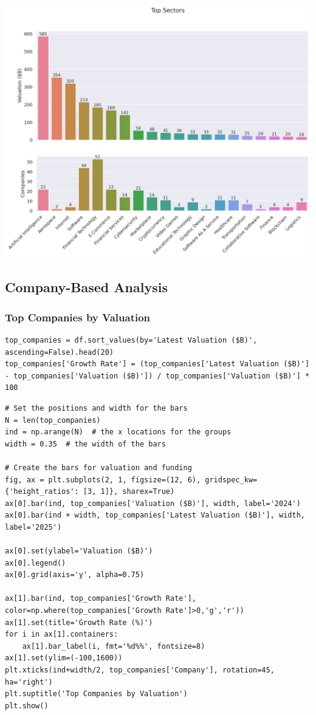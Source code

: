 \documentclass[a4paper,12pt]{article}
\begin{document}
\begin{center}
\includegraphics[width=.9\linewidth]{./.ob-jupyter/8c900de15d8f038ec9cee86aad5d7978e4f44f15.png}
\label{}
\end{center}
\subsection{Company-Based Analysis}
\label{sec:org31ed7a7}
\subsubsection{Top Companies by Valuation}
\label{sec:orgd71cd82}

\begin{verbatim}
top_companies = df.sort_values(by='Latest Valuation ($B)', ascending=False).head(20)
top_companies['Growth Rate'] = (top_companies['Latest Valuation ($B)'] - top_companies['Valuation ($B)']) / top_companies['Valuation ($B)'] * 100
\end{verbatim}

\begin{verbatim}
# Set the positions and width for the bars
N = len(top_companies)
ind = np.arange(N)  # the x locations for the groups
width = 0.35  # the width of the bars

# Create the bars for valuation and funding
fig, ax = plt.subplots(2, 1, figsize=(12, 6), gridspec_kw={'height_ratios': [3, 1]}, sharex=True)
ax[0].bar(ind, top_companies['Valuation ($B)'], width, label='2024')
ax[0].bar(ind + width, top_companies['Latest Valuation ($B)'], width, label='2025')

ax[0].set(ylabel='Valuation ($B)')
ax[0].legend()
ax[0].grid(axis='y', alpha=0.75)

ax[1].bar(ind, top_companies['Growth Rate'], color=np.where(top_companies['Growth Rate']>0,'g','r'))
ax[1].set(title='Growth Rate (%)')
for i in ax[1].containers:
    ax[1].bar_label(i, fmt='%d%%', fontsize=8)
ax[1].set(ylim=(-100,1600))
plt.xticks(ind+width/2, top_companies['Company'], rotation=45, ha='right')
plt.suptitle('Top Companies by Valuation')
plt.show()
\end{verbatim}
\end{document}

